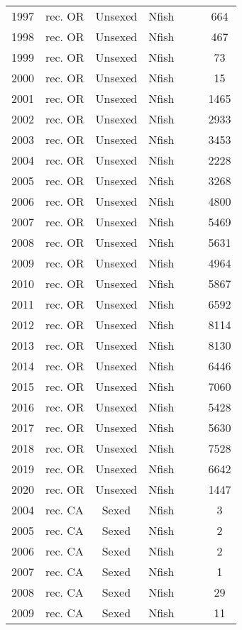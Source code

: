 \begin{longtable}[t]{c>{\centering\arraybackslash}p{3cm}ccccc}
1997 & rec. OR & Unsexed & Nfish &  &  & 664\\
1998 & rec. OR & Unsexed & Nfish &  &  & 467\\
1999 & rec. OR & Unsexed & Nfish &  &  & 73\\
2000 & rec. OR & Unsexed & Nfish &  &  & 15\\
2001 & rec. OR & Unsexed & Nfish &  &  & 1465\\
2002 & rec. OR & Unsexed & Nfish &  &  & 2933\\
2003 & rec. OR & Unsexed & Nfish &  &  & 3453\\
2004 & rec. OR & Unsexed & Nfish &  &  & 2228\\
2005 & rec. OR & Unsexed & Nfish &  &  & 3268\\
2006 & rec. OR & Unsexed & Nfish &  &  & 4800\\
2007 & rec. OR & Unsexed & Nfish &  &  & 5469\\
2008 & rec. OR & Unsexed & Nfish &  &  & 5631\\
2009 & rec. OR & Unsexed & Nfish &  &  & 4964\\
2010 & rec. OR & Unsexed & Nfish &  &  & 5867\\
2011 & rec. OR & Unsexed & Nfish &  &  & 6592\\
2012 & rec. OR & Unsexed & Nfish &  &  & 8114\\
2013 & rec. OR & Unsexed & Nfish &  &  & 8130\\
2014 & rec. OR & Unsexed & Nfish &  &  & 6446\\
2015 & rec. OR & Unsexed & Nfish &  &  & 7060\\
2016 & rec. OR & Unsexed & Nfish &  &  & 5428\\
2017 & rec. OR & Unsexed & Nfish &  &  & 5630\\
2018 & rec. OR & Unsexed & Nfish &  &  & 7528\\
2019 & rec. OR & Unsexed & Nfish &  &  & 6642\\
2020 & rec. OR & Unsexed & Nfish &  &  & 1447\\
2004 & rec. CA & Sexed & Nfish &  &  & 3\\
2005 & rec. CA & Sexed & Nfish &  &  & 2\\
2006 & rec. CA & Sexed & Nfish &  &  & 2\\
2007 & rec. CA & Sexed & Nfish &  &  & 1\\
2008 & rec. CA & Sexed & Nfish &  &  & 29\\
2009 & rec. CA & Sexed & Nfish &  &  & 11\\

\end{longtable}
